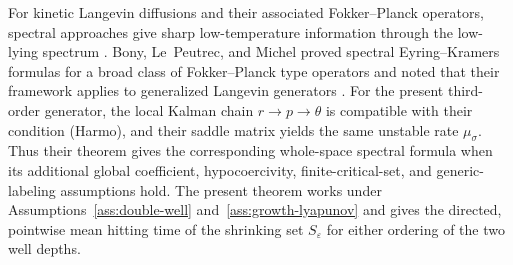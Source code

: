 \documentclass[11pt]{article}
\numberwithin{equation}{section}
\theoremstyle{plain}
\theoremstyle{definition}
\theoremstyle{remark}
\newcommand{\eps}{\varepsilon}
\begin{document}
For kinetic Langevin diffusions and their associated Fokker--Planck operators,
spectral approaches give sharp
low-temperature information through the low-lying spectrum
\cite{HerauHitrikSjostrand2008,BonyLePeutrecMichel2025}.
Bony, Le~Peutrec, and Michel proved spectral Eyring--Kramers formulas for a
broad class of Fokker--Planck type operators and noted that their framework
applies to generalized Langevin generators
\cite[Theorem~2 and p.~4359]{BonyLePeutrecMichel2025}.  For the present
third-order generator, the local Kalman chain $r\to p\to\theta$ is compatible
with their condition \textup{(Harmo)}, and their saddle matrix yields the same
unstable rate $\mu_\sigma$.  Thus their theorem gives the corresponding
whole-space spectral formula when its additional global coefficient,
hypocoercivity, finite-critical-set, and generic-labeling assumptions hold.
The present theorem works under
Assumptions~\ref{ass:double-well} and~\ref{ass:growth-lyapunov} and gives the
directed, pointwise mean hitting time of the shrinking set $S_\eps$ for
either ordering of the two well depths.
\end{document}
